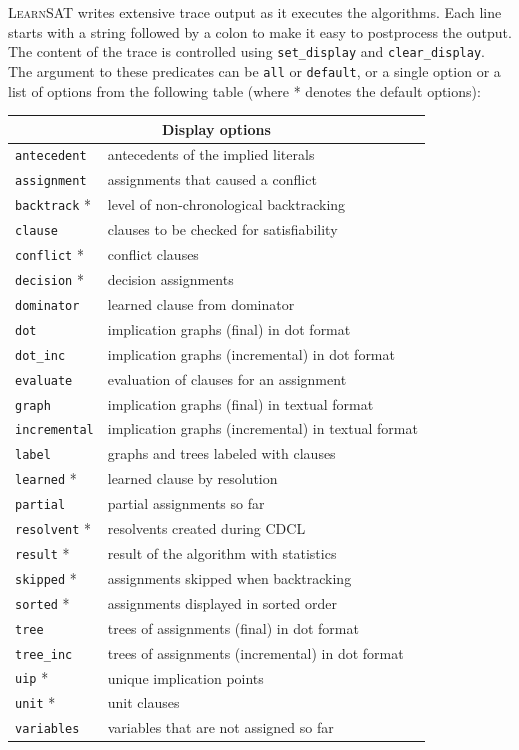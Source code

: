 \documentclass[11pt]{article}
\newcommand*{\p}[1]{\textup{\texttt{#1}}}
\newcommand*{\ls}{\textsc{LearnSAT}}
\begin{document}
\ls{} writes extensive trace output as it executes the algorithms. Each
line starts with a string followed by a colon to make it easy to
postprocess the output. The content of the trace is controlled using
\p{set\_display} and \p{clear\_display}. The argument to these
predicates can be \p{all} or \p{default}, or a single option or a list
of options from the following table (where * denotes the default
options):


\begin{center}
\begin{tabular}{|l|l|}
\hline
\multicolumn{2}{|c|}{\textbf{\large Display options}}\\
\hline
\p{antecedent}  &  antecedents of the implied literals\\
\p{assignment}  &  assignments that caused a conflict         \\
\p{backtrack} * &  level of non-chronological backtracking    \\
\p{clause}      &  clauses to be checked for satisfiability   \\
\p{conflict} *  &  conflict clauses                           \\
\p{decision} *  &  decision assignments                       \\
\p{dominator}   &  learned clause from dominator  \\
\p{dot}         &  implication graphs (final) in dot format           \\
\p{dot\_inc}    &  implication graphs (incremental) in dot format\\
\p{evaluate}    &  evaluation of clauses for an assignment    \\
\p{graph}       &  implication graphs (final) in textual format                \\
\p{incremental} &  implication graphs (incremental) in textual format          \\
\p{label}       &  graphs and trees labeled with clauses\\
\p{learned} *   &  learned clause by resolution  \\
\p{partial}     &  partial assignments so far                  \\
\p{resolvent} * &  resolvents created during CDCL             \\
\p{result} *    &  result of the algorithm with statistics    \\
\p{skipped} *   &  assignments skipped when backtracking      \\
\p{sorted} *    &  assignments displayed in sorted order\\
\p{tree}        &  trees of assignments (final) in dot format\\
\p{tree\_inc}   &  trees of assignments (incremental) in dot format\\
\p{uip} *       &  unique implication points                  \\
\p{unit} *      &  unit clauses                               \\
\p{variables}   &  variables that are not assigned so far     \\
\hline
\end{tabular}
\end{center}
\end{document}
